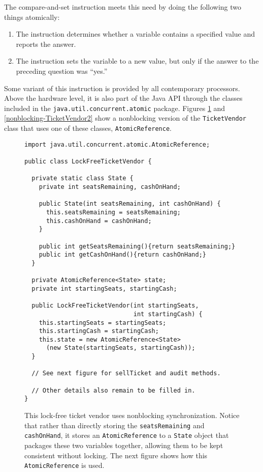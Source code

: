 The compare-and-set instruction meets this need by doing the following two things atomically:
\begin{enumerate}
\item The instruction determines whether a variable contains a specified value and reports the answer.
\item The instruction sets the variable to a new value, but only if the answer to the preceding question was ``yes.''
\end{enumerate}
Some variant of this instruction is provided by all contemporary processors.  Above the hardware
level, it is also part of the Java API through the classes included in the \texttt{java.util.concurrent.atomic} package.
Figures \ref{nonblocking-TicketVendor1} and \ref{nonblocking-TicketVendor2} show a nonblocking version of the \texttt{TicketVendor} class that uses one
of these classes, \texttt{AtomicReference}.
\begin{figure}
\begin{verbatim}
import java.util.concurrent.atomic.AtomicReference;

public class LockFreeTicketVendor { 
    
  private static class State {
    private int seatsRemaining, cashOnHand;
    
    public State(int seatsRemaining, int cashOnHand) {
      this.seatsRemaining = seatsRemaining;
      this.cashOnHand = cashOnHand;
    }

    public int getSeatsRemaining(){return seatsRemaining;}
    public int getCashOnHand(){return cashOnHand;}
  }

  private AtomicReference<State> state;
  private int startingSeats, startingCash;

  public LockFreeTicketVendor(int startingSeats,
                              int startingCash) {
    this.startingSeats = startingSeats;
    this.startingCash = startingCash;
    this.state = new AtomicReference<State>
      (new State(startingSeats, startingCash));
  }

  // See next figure for sellTicket and audit methods.

  // Other details also remain to be filled in.
}
\end{verbatim}
\caption{This lock-free ticket vendor uses nonblocking synchronization.
Notice that rather than directly storing the \texttt{seatsRemaining}
and \texttt{cashOnHand}, it stores an \texttt{AtomicReference} to a
\texttt{State} object that packages these two variables together,
allowing them to be kept consistent without locking.
The next figure shows how this \texttt{AtomicReference} is used.}\label{nonblocking-TicketVendor1}
\end{figure}

